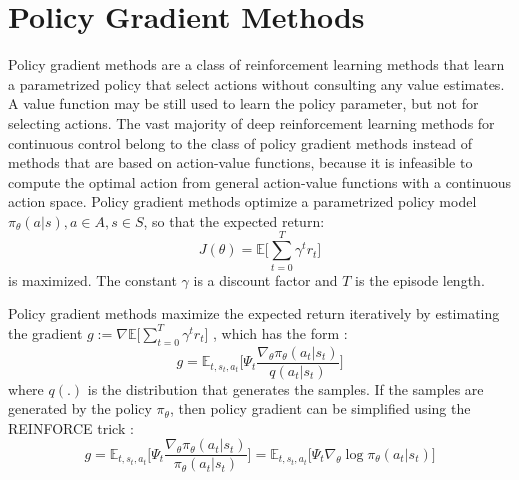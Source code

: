 \section{Policy Gradient Methods}
Policy gradient methods are a class of reinforcement learning methods that learn a parametrized policy that select actions without consulting any value estimates. A value function may be still used to learn the policy parameter, but not for selecting actions. The vast majority of deep reinforcement learning methods for continuous control belong to the class of policy gradient methods instead of methods that are based on action-value functions, because it is infeasible to compute the optimal action from general action-value functions with a continuous action space.
Policy gradient methods optimize a parametrized policy model $\pi_\theta (a|s), a\in A, s\in S$, so that the expected return:
$$
    J(\theta) = \mathbb{E}\big[\sum_{t=0}^T\gamma^t r_t \big]
$$
is maximized. The constant $\gamma$ is a discount factor and $T$ is the episode length.

Policy gradient methods maximize the expected return iteratively by estimating the gradient $g := \nabla  \mathbb{E}\big[\sum_{t=0}^T\gamma^t r_t \big]$ , which has the form \cite{schulman2015high}:
\begin{equation} g = \mathbb{E}_{t,s_t,a_t} \big[
\Psi_t \frac{\nabla_\theta \pi_\theta(a_t|s_t) }{q(a_t|s_t)}
\big]
\label{pg_def}\end{equation}
where $q(.)$ is the distribution that generates the samples. If the samples are generated by the policy $\pi_\theta$, then policy gradient can be simplified using the REINFORCE trick \cite{williams1992simple}:
\begin{equation} g = \mathbb{E}_{t,s_t,a_t} \big[
\Psi_t \frac{\nabla_\theta \pi_\theta(a_t|s_t) }{\pi_\theta(a_t|s_t)}
\big]
=\mathbb{E}_{t,s_t,a_t} \big[
\Psi_t \nabla_\theta \log \pi_\theta(a_t|s_t) 
\big]
\label{pg_def_onpolicy}\end{equation}


